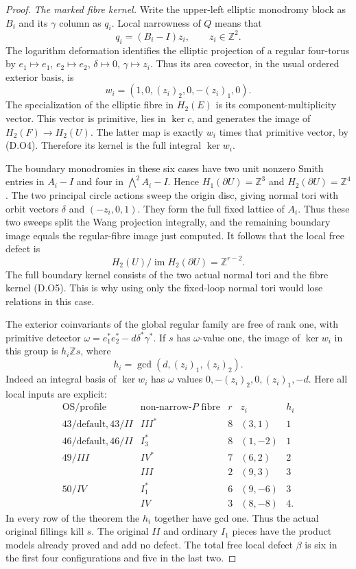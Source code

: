 \begin{proof}
\emph{The marked fibre kernel.}
Write the upper-left elliptic monodromy block as $B_i$
and its $\gamma$ column as $q_i$. Local narrowness of $Q$
means that
\[
                 q_i=(B_i-I)z_i,\qquad z_i\in\mathbb Z^2.
\]
The logarithm deformation identifies the elliptic
projection of a regular four-torus by
$e_1\mapsto e_1$, $e_2\mapsto e_2$, $\delta\mapsto0$,
$\gamma\mapsto z_i$. Thus its area covector, in the
usual ordered exterior basis, is
\[
           w_i=(1,0,(z_i)_2,0,-(z_i)_1,0).
 \tag{D.O5}
\]
The specialization of the elliptic fibre in $H_2(E)$
is its component-multiplicity vector. This vector is
primitive, lies in $\ker c$, and generates the image
of $H_2(F)\to H_2(U)$. The latter map is exactly
$w_i$ times that primitive vector, by (D.O4).
Therefore its kernel is the full integral $\ker w_i$.

The boundary monodromies in these six cases have two
unit nonzero Smith entries in $A_i-I$ and four in
$\bigwedge^2A_i-I$. Hence $H_1(\partial U)=\mathbb Z^3$
and $H_2(\partial U)=\mathbb Z^4$.
The two principal circle actions sweep the origin
disc, giving normal tori with orbit vectors
$\delta$ and $(-z_i,0,1)$. They form the full fixed
lattice of $A_i$. Thus these two sweeps split the
Wang projection integrally, and the remaining
boundary image equals the regular-fibre image just
computed. It follows that the local free defect is
\[
                H_2(U)/\operatorname{im}H_2(\partial U)
                         =\mathbb Z^{r-2}.
 \tag{D.O6}
\]
The full boundary kernel consists of the two actual
normal tori and the fibre kernel (D.O5). This is why
using only the fixed-loop normal tori would lose
relations in this case.

The exterior coinvariants of the global regular family
are free of rank one, with primitive detector
$\omega=e_1^*e_2^*-d\delta^*\gamma^*$.
If $s$ has $\omega$-value one, the image of $\ker w_i$
in this group is $h_i\mathbb Zs$, where
\[
                  h_i=\gcd(d,(z_i)_1,(z_i)_2).
\]
Indeed an integral basis of $\ker w_i$ has $\omega$
values $0,-(z_i)_2,0,(z_i)_1,-d$.
Here all local inputs are explicit:
\[
\begin{array}{c|c|r|r|r}
 \mathrm{OS/profile}&\text{non-narrow-}P\text{ fibre}
       &r&z_i&h_i\\\hline
 43/\mathrm{default},43/II&III^*&8&(3,1)&1\\
 46/\mathrm{default},46/II&I_3^*&8&(1,-2)&1\\
 49/III&IV^*&7&(6,2)&2\\
       &III&2&(9,3)&3\\
 50/IV&I_1^*&6&(9,-6)&3\\
      &IV&3&(8,-8)&4.
\end{array}
\tag{D.O7}
\]
In every row of the theorem the $h_i$ together have gcd
one. Thus the actual original fillings kill $s$.
The original $II$ and ordinary $I_1$ pieces have the
product models already proved and add no defect.
The total free local defect $\beta$ is six in the first
four configurations and five in the last two.


\end{proof}
